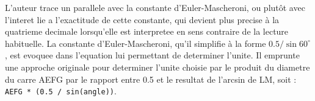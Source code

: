 \documentclass[12pt,a4paper]{article}
\theoremstyle{definition}
\theoremstyle{remark}
\begin{document}
L'auteur trace un parallele avec la constante d'Euler-Mascheroni, 
ou plut\^ot avec l'interet lie a l'exactitude de cette constante, 
qui devient plus precise \`a la quatrieme decimale lorsqu'elle est interpretee 
en sens contraire de la lecture habituelle. 
La constante d'Euler-Mascheroni, qu'il simplifie \`a la forme 
\(0.5 / \sin 60^\circ\), est evoquee dans l'equation lui permettant 
de determiner l'unite. Il emprunte une approche originale pour determiner 
l'unite choisie par le produit du diametre du carre AEFG 
par le rapport entre 0.5 et le resultat de l'arcsin de LM, 
soit : \texttt{AEFG * (0.5 / sin(angle))}.

\vspace{0.8cm}

\end{document}
